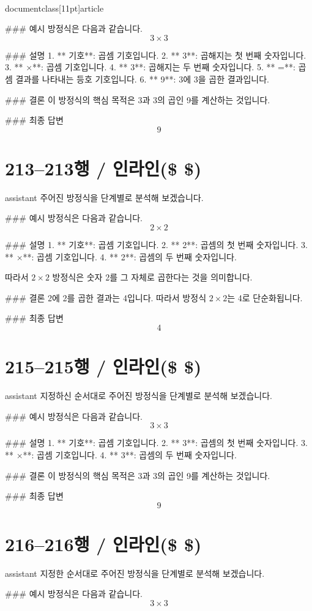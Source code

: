 \\documentclass[11pt]{article}
\begin{document}
### 예시
방정식은 다음과 같습니다.
\[ 3 \times 3 \]

### 설명
1. ** 기호**: 곱셈 기호입니다.
2. ** 3**: 곱해지는 첫 번째 숫자입니다.
3. ** ×**: 곱셈 기호입니다.
4. ** 3**: 곱해지는 두 번째 숫자입니다.
5. ** =**: 곱셈 결과를 나타내는 등호 기호입니다.
6. ** 9**: 3에 3을 곱한 결과입니다.

### 결론
이 방정식의 핵심 목적은 3과 3의 곱인 9를 계산하는 것입니다.

### 최종 답변
\[
\boxed{9}
\]

\section*{213–213행 / 인라인(\$ \$) }
assistant
주어진 방정식을 단계별로 분석해 보겠습니다.

### 예시
방정식은 다음과 같습니다.
\[ 2 \times 2 \]

### 설명
1. ** 기호**: 곱셈 기호입니다.
2. ** 2**: 곱셈의 첫 번째 숫자입니다.
3. ** ×**: 곱셈 기호입니다.
4. ** 2**: 곱셈의 두 번째 숫자입니다.

따라서 \( 2 \times 2 \) 방정식은 숫자 2를 그 자체로 곱한다는 것을 의미합니다.

### 결론
2에 2를 곱한 결과는 4입니다. 따라서 방정식 \( 2 \times 2 \)는 4로 단순화됩니다.

### 최종 답변
\[
\boxed{4}
\]

\section*{215–215행 / 인라인(\$ \$) }
assistant
지정하신 순서대로 주어진 방정식을 단계별로 분석해 보겠습니다.

### 예시
방정식은 다음과 같습니다.
\[ 3 \times 3 \]

### 설명
1. ** 기호**: 곱셈 기호입니다.
2. ** 3**: 곱셈의 첫 번째 숫자입니다.
3. ** ×**: 곱셈 기호입니다.
4. ** 3**: 곱셈의 두 번째 숫자입니다.

### 결론
이 방정식의 핵심 목적은 3과 3의 곱인 9를 계산하는 것입니다.

### 최종 답변
\[
\boxed{9}
\]

\section*{216–216행 / 인라인(\$ \$) }
assistant
지정한 순서대로 주어진 방정식을 단계별로 분석해 보겠습니다.

### 예시
방정식은 다음과 같습니다.
\[ 3 \times 3 \]
\end{document}
